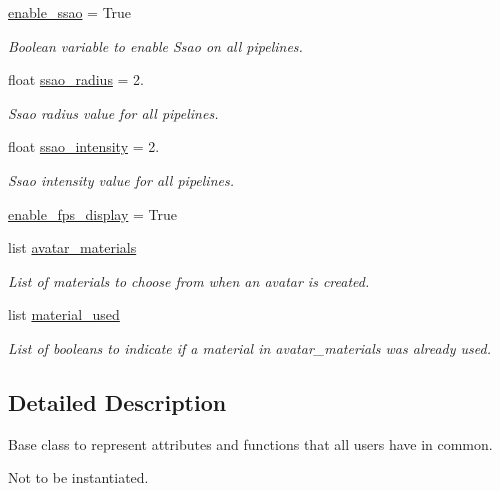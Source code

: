 \begin{DoxyCompactItemize}
\hyperlink{classlib_1_1User_1_1User_a5a5a10220b495e9b86d62699819222c4}{enable\-\_\-ssao} = \-True
\begin{DoxyCompactList}\small\item\em \-Boolean variable to enable \-Ssao on all pipelines. \end{DoxyCompactList}\item 
float \hyperlink{classlib_1_1User_1_1User_a08dc9a8a092cc9e8223a2ce1e4d68766}{ssao\-\_\-radius} = 2.
\begin{DoxyCompactList}\small\item\em \-Ssao radius value for all pipelines. \end{DoxyCompactList}\item 
float \hyperlink{classlib_1_1User_1_1User_a71b7508fdf83ab837f009c32cd45652e}{ssao\-\_\-intensity} = 2.
\begin{DoxyCompactList}\small\item\em \-Ssao intensity value for all pipelines. \end{DoxyCompactList}\item 
\hyperlink{classlib_1_1User_1_1User_a50a8a606e278acc350db36ef6a2296a5}{enable\-\_\-fps\-\_\-display} = \-True
\item 
list \hyperlink{classlib_1_1User_1_1User_a40f71a472b1fc0ea63f5fc6ecb2a0b67}{avatar\-\_\-materials}
\begin{DoxyCompactList}\small\item\em \-List of materials to choose from when an avatar is created. \end{DoxyCompactList}\item 
list \hyperlink{classlib_1_1User_1_1User_af1d08431c58ab9f2662c26305d102996}{material\-\_\-used}
\begin{DoxyCompactList}\small\item\em \-List of booleans to indicate if a material in avatar\-\_\-materials was already used. \end{DoxyCompactList}\end{DoxyCompactItemize}


\subsection{\-Detailed \-Description}
\-Base class to represent attributes and functions that all users have in common. 

\-Not to be instantiated. 


